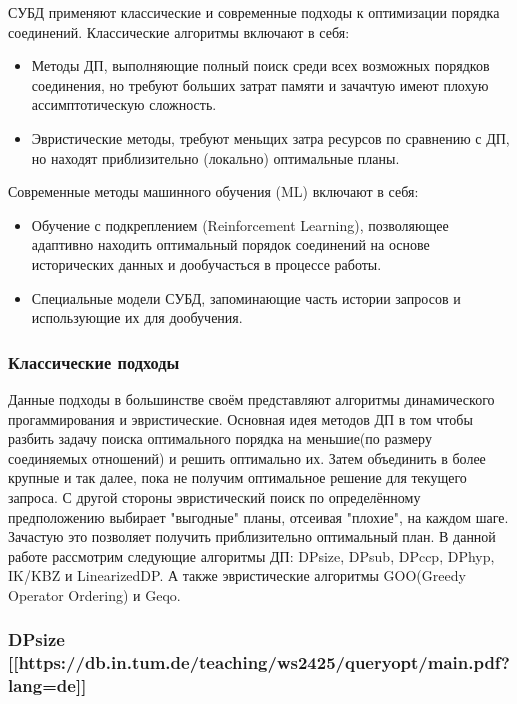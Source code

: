\documentclass[12pt]{article}
\begin{document}
\begin{flushleft}
СУБД применяют классические и современные подходы к оптимизации 
порядка соединений.
\newline
Классические алгоритмы включают в себя:
\begin{itemize}
\item Методы ДП, выполняющие полный поиск среди всех возможных порядков
соединения, но требуют больших затрат памяти и зачачтую имеют плохую
ассимптотическую сложность.
\item Эвристические методы, требуют меньщих затра ресурсов по сравнению
с ДП, но находят приблизительно (локально) оптимальные планы.
\end{itemize}
Современные методы машинного обучения (ML) включают в себя:
\begin{itemize}
\item Обучение с подкреплением (Reinforcement Learning), позволяющее 
адаптивно находить оптимальный порядок соединений на основе исторических 
данных и дообучасться в процессе работы.
\item Специальные модели СУБД, запоминающие часть истории запросов и использующие их
для дообучения.
\end{itemize}

\centering \subsubsection*{Классические подходы}
\raggedright
Данные подходы в большинстве своём представляют алгоритмы динамического
прогаммирования и эвристические.
\newline
Основная идея методов ДП в том чтобы разбить задачу поиска оптимального
порядка на меньшие(по размеру соединяемых отношений) и решить оптимально их. Затем 
объединить в более крупные и так далее, пока не получим оптимальное решение 
для текущего запроса.
\newline
С другой стороны эвристический поиск по определённому предположению выбирает
"выгодные" планы, отсеивая "плохие", на каждом шаге. Зачастую это позволяет
получить приблизительно оптимальный план.
\newline
В данной работе рассмотрим следующие алгоритмы ДП: DPsize, DPsub, DPccp, 
DPhyp, IK/KBZ и LinearizedDP. А также эвристические алгоритмы GOO(Greedy Operator Ordering) и 
Geqo.

\centering \subsubsection*{DPsize [[https://db.in.tum.de/teaching/ws2425/queryopt/main.pdf?lang=de]]} 
\raggedright


\end{flushleft}
\end{document}
